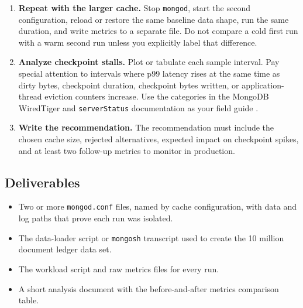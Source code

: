 \begin{enumerate}
    \item \textbf{Repeat with the larger cache.} Stop \texttt{mongod}, start the second configuration, reload or restore the same baseline data shape, run the same duration, and write metrics to a separate file. Do not compare a cold first run with a warm second run unless you explicitly label that difference.

    \item \textbf{Analyze checkpoint stalls.} Plot or tabulate each sample interval. Pay special attention to intervals where p99 latency rises at the same time as dirty bytes, checkpoint duration, checkpoint bytes written, or application-thread eviction counters increase. Use the categories in the MongoDB WiredTiger and \texttt{serverStatus} documentation as your field guide \cite{mongodbWiredTigerDocs,mongodbServerStatusDocs}.

    \item \textbf{Write the recommendation.} The recommendation must include the chosen cache size, rejected alternatives, expected impact on checkpoint spikes, and at least two follow-up metrics to monitor in production.
\end{enumerate}

\subsection*{Deliverables}
\begin{itemize}
    \item Two or more \texttt{mongod.conf} files, named by cache configuration, with data and log paths that prove each run was isolated.
    \item The data-loader script or \texttt{mongosh} transcript used to create the 10 million document ledger data set.
    \item The workload script and raw metrics files for every run.
    \item A short analysis document with the before-and-after metrics comparison table.
\end{itemize}

